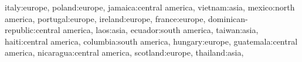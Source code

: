 \documentclass[
  letterpaper,
  DIV=11,
  numbers=noendperiod]{scrartcl}
\newenvironment{Shaded}{\begin{snugshade}}{\end{snugshade}}
\newcommand{\NormalTok}[1]{\textcolor[rgb]{0.00,0.23,0.31}{#1}}
\newcommand{\StringTok}[1]{\textcolor[rgb]{0.13,0.47,0.30}{#1}}
\begin{document}
\begin{Shaded}
\begin{Highlighting}[]
    \StringTok{\textquotesingle{}italy\textquotesingle{}}\NormalTok{:}\StringTok{\textquotesingle{}europe\textquotesingle{}}\NormalTok{,}
    \StringTok{\textquotesingle{}poland\textquotesingle{}}\NormalTok{:}\StringTok{\textquotesingle{}europe\textquotesingle{}}\NormalTok{,}
    \StringTok{\textquotesingle{}jamaica\textquotesingle{}}\NormalTok{:}\StringTok{\textquotesingle{}central america\textquotesingle{}}\NormalTok{,}
    \StringTok{\textquotesingle{}vietnam\textquotesingle{}}\NormalTok{:}\StringTok{\textquotesingle{}asia\textquotesingle{}}\NormalTok{,}
    \StringTok{\textquotesingle{}mexico\textquotesingle{}}\NormalTok{:}\StringTok{\textquotesingle{}north america\textquotesingle{}}\NormalTok{,}
    \StringTok{\textquotesingle{}portugal\textquotesingle{}}\NormalTok{:}\StringTok{\textquotesingle{}europe\textquotesingle{}}\NormalTok{,}
    \StringTok{\textquotesingle{}ireland\textquotesingle{}}\NormalTok{:}\StringTok{\textquotesingle{}europe\textquotesingle{}}\NormalTok{,}
    \StringTok{\textquotesingle{}france\textquotesingle{}}\NormalTok{:}\StringTok{\textquotesingle{}europe\textquotesingle{}}\NormalTok{,}
    \StringTok{\textquotesingle{}dominican{-}republic\textquotesingle{}}\NormalTok{:}\StringTok{\textquotesingle{}central america\textquotesingle{}}\NormalTok{,}
    \StringTok{\textquotesingle{}laos\textquotesingle{}}\NormalTok{:}\StringTok{\textquotesingle{}asia\textquotesingle{}}\NormalTok{,}
    \StringTok{\textquotesingle{}ecuador\textquotesingle{}}\NormalTok{:}\StringTok{\textquotesingle{}south america\textquotesingle{}}\NormalTok{,}
    \StringTok{\textquotesingle{}taiwan\textquotesingle{}}\NormalTok{:}\StringTok{\textquotesingle{}asia\textquotesingle{}}\NormalTok{,}
    \StringTok{\textquotesingle{}haiti\textquotesingle{}}\NormalTok{:}\StringTok{\textquotesingle{}central america\textquotesingle{}}\NormalTok{,}
    \StringTok{\textquotesingle{}columbia\textquotesingle{}}\NormalTok{:}\StringTok{\textquotesingle{}south america\textquotesingle{}}\NormalTok{,}
    \StringTok{\textquotesingle{}hungary\textquotesingle{}}\NormalTok{:}\StringTok{\textquotesingle{}europe\textquotesingle{}}\NormalTok{,}
    \StringTok{\textquotesingle{}guatemala\textquotesingle{}}\NormalTok{:}\StringTok{\textquotesingle{}central america\textquotesingle{}}\NormalTok{,}
    \StringTok{\textquotesingle{}nicaragua\textquotesingle{}}\NormalTok{:}\StringTok{\textquotesingle{}central america\textquotesingle{}}\NormalTok{,}
    \StringTok{\textquotesingle{}scotland\textquotesingle{}}\NormalTok{:}\StringTok{\textquotesingle{}europe\textquotesingle{}}\NormalTok{,}
    \StringTok{\textquotesingle{}thailand\textquotesingle{}}\NormalTok{:}\StringTok{\textquotesingle{}asia\textquotesingle{}}\NormalTok{,}

\end{Highlighting}
\end{Shaded}
\end{document}
